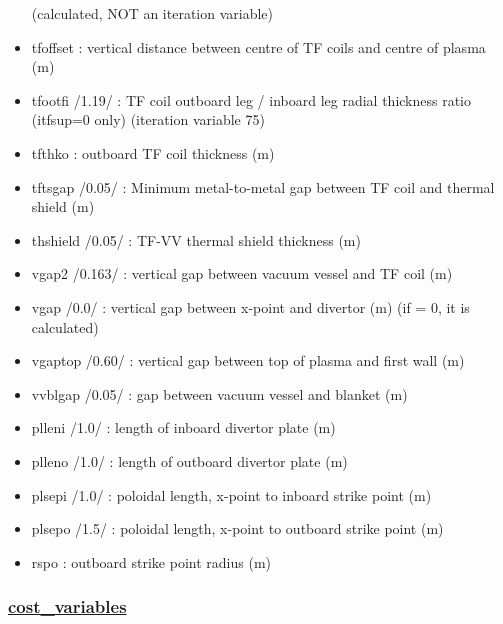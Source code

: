 \documentclass[]{article}
\begin{document}
\begin{itemize}
  (calculated, NOT an iteration variable)
\item
  tfoffset : vertical distance between centre of TF coils and centre of
  plasma (m)
\item
  tfootfi /1.19/ : TF coil outboard leg / inboard leg radial thickness
  ratio (itfsup=0 only) (iteration variable 75)
\item
  tfthko : outboard TF coil thickness (m)
\item
  tftsgap /0.05/ : Minimum metal-to-metal gap between TF coil and
  thermal shield (m)
\item
  thshield /0.05/ : TF-VV thermal shield thickness (m)
\item
  vgap2 /0.163/ : vertical gap between vacuum vessel and TF coil (m)
\item
  vgap /0.0/ : vertical gap between x-point and divertor (m) (if = 0, it
  is calculated)
\item
  vgaptop /0.60/ : vertical gap between top of plasma and first wall (m)
\item
  vvblgap /0.05/ : gap between vacuum vessel and blanket (m)
\item
  plleni /1.0/ : length of inboard divertor plate (m)
\item
  plleno /1.0/ : length of outboard divertor plate (m)
\item
  plsepi /1.0/ : poloidal length, x-point to inboard strike point (m)
\item
  plsepo /1.5/ : poloidal length, x-point to outboard strike point (m)
\item
  rspo : outboard strike point radius (m)
\end{itemize}

\subsubsection{\texorpdfstring{\href{cost_variables.html}{cost\_variables}}{cost\_variables}}\label{cost_variables}
\end{document}
